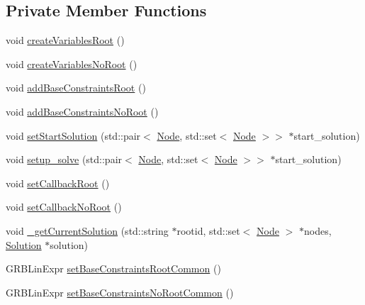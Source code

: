 \subsection*{Private Member Functions}
\begin{DoxyCompactItemize}
\item 
void \hyperlink{classderegnet_1_1DeregnetModel_ad985c03d46183b994dd6f6c037d1c53f}{create\+Variables\+Root} ()
\item 
void \hyperlink{classderegnet_1_1DeregnetModel_ad3700418efd7be24df0d3a16a991a559}{create\+Variables\+No\+Root} ()
\item 
void \hyperlink{classderegnet_1_1DeregnetModel_a65d0e8cac88cc6735659ab41610fd1c9}{add\+Base\+Constraints\+Root} ()
\item 
void \hyperlink{classderegnet_1_1DeregnetModel_a808586dd1edcbadefc04de1c378a6cfa}{add\+Base\+Constraints\+No\+Root} ()
\item 
void \hyperlink{classderegnet_1_1DeregnetModel_a7a76da5bb39123d94c57ba2c940cb1c2}{set\+Start\+Solution} (std\+::pair$<$ \hyperlink{namespacederegnet_a744bad34f2de9856d36715a445f027f3}{Node}, std\+::set$<$ \hyperlink{namespacederegnet_a744bad34f2de9856d36715a445f027f3}{Node} $>$$>$ $\ast$start\+\_\+solution)
\item 
void \hyperlink{classderegnet_1_1DeregnetModel_a502657403c84cbdc66ad845c56dee339}{setup\+\_\+solve} (std\+::pair$<$ \hyperlink{namespacederegnet_a744bad34f2de9856d36715a445f027f3}{Node}, std\+::set$<$ \hyperlink{namespacederegnet_a744bad34f2de9856d36715a445f027f3}{Node} $>$$>$ $\ast$start\+\_\+solution)
\item 
void \hyperlink{classderegnet_1_1DeregnetModel_a19332c492a33a1e488ed916947d38c08}{set\+Callback\+Root} ()
\item 
void \hyperlink{classderegnet_1_1DeregnetModel_a6cecefeafaf782843c91e0c55e768a94}{set\+Callback\+No\+Root} ()
\item 
void \hyperlink{classderegnet_1_1DeregnetModel_a8b4f6be55c874c039c8180c1288f0319}{\+\_\+get\+Current\+Solution} (std\+::string $\ast$rootid, std\+::set$<$ \hyperlink{namespacederegnet_a744bad34f2de9856d36715a445f027f3}{Node} $>$ $\ast$nodes, \hyperlink{structderegnet_1_1Solution}{Solution} $\ast$solution)
\item 
G\+R\+B\+Lin\+Expr \hyperlink{classderegnet_1_1DeregnetModel_ab6093e7558a653c17145e8e08a96938f}{set\+Base\+Constraints\+Root\+Common} ()
\item 
G\+R\+B\+Lin\+Expr \hyperlink{classderegnet_1_1DeregnetModel_a5f6cc627b7a800f3d9d77f5f859d241c}{set\+Base\+Constraints\+No\+Root\+Common} ()

\end{DoxyCompactItemize}
